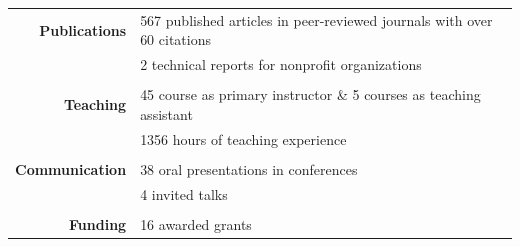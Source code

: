 


\begin{tabular}{rl}
\textbf{Publications} & 567 published articles in peer-reviewed journals with over 60 citations \\
& 2 technical reports for nonprofit organizations\\
& \\
\textbf{Teaching} & 45 course as primary instructor \& 5 courses as teaching assistant \\
& 1356 hours of teaching experience\\
& \\
\textbf{Communication} & 38 oral presentations in conferences \\
& 4 invited talks \\
& \\
\textbf{Funding} & 16 awarded grants \\
\end{tabular}
